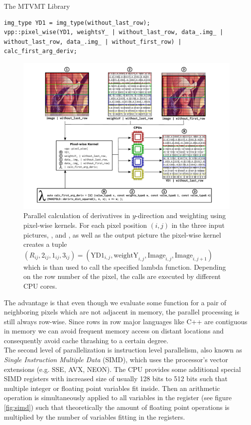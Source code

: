 \begin{chapter}{The MTVMT Library}
\begin{lstlisting}[label=code:pixelwise_demo,caption={Pixel-wise forward derivative computation}]
img_type YD1 = img_type(without_last_row);
vpp::pixel_wise(YD1, weightsY_ | without_last_row, data_.img_ | without_last_row, data_.img_ | without_first_row) | calc_first_arg_deriv;
\end{lstlisting}

\begin{figure}[h!]
        \centering
	    \includegraphics[width=1.0\linewidth]{./figures/library/pixelwise_kernel.pdf}
	\caption[Calculation using pixel-wise kernels]{Parallel calculation of derivatives in $y$-direction and weighting using pixel-wise kernels.
	    For each pixel position $(i,j)$ in the three input pictures, ,  and , as well as the output picture
	     the pixel-wise kernel creates a tuple $(R_{ij}, 2_{ij}, 1_{ij}, 3_{ij})=(\text{YD1}_{i,j},\text{weightY}_{i,j},\text{Image}_{i,j},\text{Image}_{i,j+1})$
	    which is than used to call the specified lambda function. Depending on the row number of the pixel, the calls are executed by different CPU cores.
	}
	\label{fig:pixelwise_kernel}
\end{figure}

The advantage is that even though we evaluate some function for a pair of neighboring pixels which are not adjacent in memory, the parallel processing is still
always row-wise. Since rows in row major languages like C++ are contiguous in memory we can avoid frequent memory access on distant locations and consequently avoid cache thrashing to a
certain degree.\\

The second level of parallelization is instruction level parallelism, also known as \textit{Single Instruction Multiple Data} (SIMD), which uses the
processor's vector extensions (e.g. SSE, AVX, NEON).
The CPU provides some additional special SIMD registers with increased size of usually 128 bits to 512 bits such that multiple integer or floating point variables fit inside.
Then an arithmetic operation is simultaneously applied to all variables in the register (see figure \ref{fig:simd}) such that theoretically the amount of floating point operations is multiplied by the number
of variables fitting in the registers. \\


\end{chapter}
